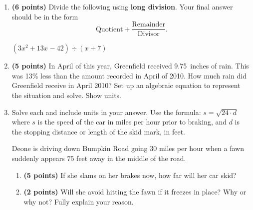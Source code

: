 \documentclass[12pt]{amsart}
\begin{document}
\begin{enumerate}
  
\vfill \vfill \vfill
\def \a{7}\def \b{3}\def \c{-8}\def \r{14}\def \monicpol{x^{}+7}\def \longnbad{3x^{2}+13x^{}-42}\def \anspol{3x^{}-8}
\item {\bf (6 points)} 
 Divide the following using {\bf long division}. Your final answer should be in the form $$ \text{Quotient} + \dfrac{\text{Remainder}}{\text{Divisor}}.$$

\vspace{3mm}

$(\longnbad) \div (\monicpol)$

\vfill  \vfill \vfill
\newpage\def \discount{13}\def \paid{1893.58}\def \rainy{9.75}\def \orcost{2176.53}\def \purcost{1675.73}\def \orrainy{11.21}
\item {\bf (5 points)} 
 In April of this year, Greenfield received \rainy\ inches of rain. This was \discount\% less than the amount recorded in April of 2010. How much rain did Greenfield  receive in April 2010? Set up an algebraic equation to represent the situation and solve. Show units.

\vfill 
\def \insvar{24}\def \d{75}\def \zerospeed{42.43}\def \slimit{30}\def \s{55}\def \skidd{126.042}\def \safed{37.5}\def \rsafed{37}

 
\item Solve each and include units in your answer. Use the formula: $s = \sqrt{\insvar \cdot d}$ where $s$ is the speed of the car in miles per hour prior to braking, and $d$ is the stopping distance or length of the skid mark, in feet. 

\vspace{3mm}

Deone is driving down Bumpkin Road going $\slimit$ miles per hour when a fawn suddenly appears $\d$ feet away in the middle of the road. \begin{enumerate}
\item {\bf (5 points)} If she slams on her brakes now, how far will her car skid? \vspace{4cm}
\item {\bf (2 points)} Will she avoid hitting the fawn if it freezes in place? Why or why not? Fully explain your reason. \vspace{3cm}
\end{enumerate}



\end{enumerate}
\end{document}
